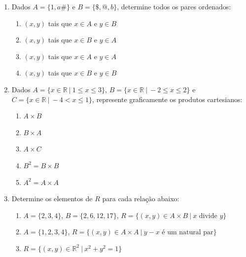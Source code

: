 \documentclass[a4paper,5pt]{amsbook}
\begin{document}
\vspace{1cm}
\begin{enumerate}
    \setlength\itemsep{0.5cm}
    \item Dados $A=\{1,a\#\}$ e $B=\{\$,@,b\}$, determine todos os pares ordenados:
        \begin{enumerate}
            \setlength\itemsep{0.2cm}
            \item $(x,y)$ tais que $x\in A$ e $y\in B$
            \item $(x,y)$ tais que $x\in B$ e $y\in A$
            \item $(x,y)$ tais que $x\in A$ e $y\in A$
            \item $(x,y)$ tais que $x\in B$ e $y\in B$
        \end{enumerate}

    \item Dados $A=\{x\in\mathbb{R}\ |\ 1\le x \le 3\}$, $B=\{x\in\mathbb{R}\
    |\ -2\le x \le 2\}$ e $C=\{x\in\mathbb{R}\ |\ -4 < x \le 1\}$, represente
    graficamente os produtos cartesianos:
        \begin{enumerate}
            \setlength\itemsep{0.2cm}
            \item $A\times B$
            \item $B\times A$
            \item $A\times C$
            \item $B^2=B\times B$
            \item $A^2=A\times A$
        \end{enumerate}

    \item Determine os elementos de $R$ para cada rela\c{c}\~ao abaixo:
        \begin{enumerate}
            \setlength\itemsep{0.2cm}
            \item $A=\{2,3,4\}$, $B=\{2,6,12,17\}$, $R=\{(x,y)\in A\times B\ |\
            x \mbox{ divide } y\}$
            \item $A=\{1,2,3,4\}$, $R=\{(x,y)\in A\times A\ |\ y-x \mbox{ \'e um
            natural par}\}$
            \item $R=\{(x,y)\in\mathbb{R}^2\ |\ x^2+y^2=1\}$
        \end{enumerate}
\end{enumerate}
\end{document}
